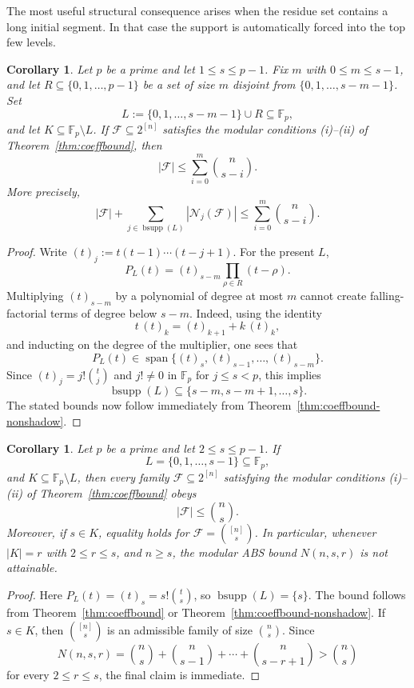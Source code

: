 \documentclass[11pt]{article}
\theoremstyle{plain}
\newtheorem{corollary}[theorem]{Corollary}
\theoremstyle{remark}
\newcommand{\F}{\mathcal{F}}
\newcommand{\N}{\mathcal{N}}
\newcommand{\abs}[1]{\left|#1\right|}
\newcommand{\bsupp}{\operatorname{bsupp}}
\begin{document}
The most useful structural consequence arises when the residue set contains a long initial segment.
In that case the support is automatically forced into the top few levels.

\begin{corollary}\label{cor:almost-initial}
Let $p$ be a prime and let $1\le s\le p-1$.
Fix $m$ with $0\le m\le s-1$, and let $R\subseteq\{0,1,\dots,p-1\}$ be a set of size $m$
disjoint from $\{0,1,\dots,s-m-1\}$.
Set
$$
  L:=\{0,1,\dots,s-m-1\}\cup R\subseteq\mathbb{F}_p,
$$
and let $K\subseteq\mathbb{F}_p\setminus L$.
If $\F\subseteq 2^{[n]}$ satisfies the modular conditions \textup{(i)}--\textup{(ii)} of Theorem~\ref{thm:coeffbound}, then
$$
  \abs{\F}\le \sum_{i=0}^{m}\binom{n}{s-i}.
$$
More precisely,
$$
  \abs{\F}+\sum_{j\in\bsupp(L)}\abs{\N_j(\F)}\le \sum_{i=0}^{m}\binom{n}{s-i}.
$$
\end{corollary}

\begin{proof}
Write $(t)_j:=t(t-1)\cdots(t-j+1)$.
For the present $L$,
$$
  P_L(t)=(t)_{s-m}\prod_{\rho\in R}(t-\rho).
$$
Multiplying $(t)_{s-m}$ by a polynomial of degree at most $m$ cannot create falling-factorial terms of degree
below $s-m$.
Indeed, using the identity
$$
  t\,(t)_k=(t)_{k+1}+k\,(t)_k,
$$
and inducting on the degree of the multiplier, one sees that
$$
  P_L(t)\in \operatorname{span}\{(t)_s,(t)_{s-1},\dots,(t)_{s-m}\}.
$$
Since $(t)_j=j!\binom{t}{j}$ and $j!\neq 0$ in $\mathbb{F}_p$ for $j\le s<p$, this implies
$$
  \bsupp(L)\subseteq\{s-m,s-m+1,\dots,s\}.
$$
The stated bounds now follow immediately from Theorem~\ref{thm:coeffbound-nonshadow}.
\end{proof}

\begin{corollary}\label{cor:consecutive}
Let $p$ be a prime and let $2\le s\le p-1$.
If
$$
  L=\{0,1,\dots,s-1\}\subseteq\mathbb{F}_p,
$$
and $K\subseteq\mathbb{F}_p\setminus L$, then every family $\F\subseteq 2^{[n]}$ satisfying the modular
conditions \textup{(i)}--\textup{(ii)} of Theorem~\ref{thm:coeffbound} obeys
$$
  \abs{\F}\le \binom{n}{s}.
$$
Moreover, if $s\in K$, equality holds for $\F=\binom{[n]}{s}$.
In particular, whenever $|K|=r$ with $2 \le r \le s$, and $n \ge s$, the modular ABS bound $N(n,s,r)$ is not attainable.
\end{corollary}

\begin{proof}
Here $P_L(t)=(t)_s=s!\binom{t}{s}$, so $\bsupp(L)=\{s\}$.
The bound follows from Theorem~\ref{thm:coeffbound} or Theorem~\ref{thm:coeffbound-nonshadow}.
If $s\in K$, then $\binom{[n]}{s}$ is an admissible family of size $\binom{n}{s}$.
Since
$$
  N(n,s,r)=\binom{n}{s}+\binom{n}{s-1}+\cdots+\binom{n}{s-r+1}>\binom{n}{s}
$$
for every $2 \le r \le s$, the final claim is immediate.
\end{proof}
\end{document}
